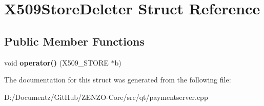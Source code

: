 \hypertarget{struct_x509_store_deleter}{}\section{X509\+Store\+Deleter Struct Reference}
\label{struct_x509_store_deleter}
\subsection*{Public Member Functions}
\begin{DoxyCompactItemize}
\item 
\mbox{\label{struct_x509_store_deleter_aa51f4b04eb2cb5728e83d732f672c363}} 
void {\bfseries operator()} (X509\+\_\+\+S\+T\+O\+RE $\ast$b)
\end{DoxyCompactItemize}


The documentation for this struct was generated from the following file\+:\begin{DoxyCompactItemize}
\item 
D\+:/\+Documentz/\+Git\+Hub/\+Z\+E\+N\+Z\+O-\/\+Core/src/qt/paymentserver.\+cpp\end{DoxyCompactItemize}
